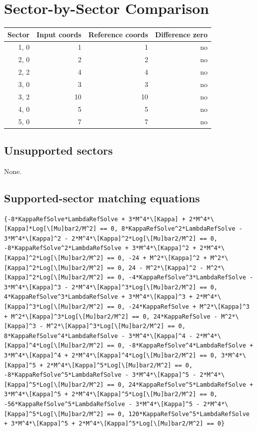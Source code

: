 \documentclass[11pt]{article}
\begin{document}
\section{Sector-by-Sector Comparison}
\begin{longtable}{rrrr}
\toprule
Sector & Input coords & Reference coords & Difference zero \\
\midrule
{1, 0} & 1 & 1 & no \\
{2, 0} & 2 & 2 & no \\
{2, 2} & 4 & 4 & no \\
{3, 0} & 3 & 3 & no \\
{3, 2} & 10 & 10 & no \\
{4, 0} & 5 & 5 & no \\
{5, 0} & 7 & 7 & no \\
\bottomrule
\end{longtable}
\subsection{Unsupported sectors}
None.
\subsection{Supported-sector matching equations}
\begin{verbatim}
{-8*KappaRefSolve*LambdaRefSolve + 3*M^4*\[Kappa] + 2*M^4*\[Kappa]*Log[\[Mu]bar2/M^2] == 0, 8*KappaRefSolve^2*LambdaRefSolve - 3*M^4*\[Kappa]^2 - 2*M^4*\[Kappa]^2*Log[\[Mu]bar2/M^2] == 0, -8*KappaRefSolve^2*LambdaRefSolve + 3*M^4*\[Kappa]^2 + 2*M^4*\[Kappa]^2*Log[\[Mu]bar2/M^2] == 0, -24 + M^2*\[Kappa]^2 + M^2*\[Kappa]^2*Log[\[Mu]bar2/M^2] == 0, 24 - M^2*\[Kappa]^2 - M^2*\[Kappa]^2*Log[\[Mu]bar2/M^2] == 0, -4*KappaRefSolve^3*LambdaRefSolve - 3*M^4*\[Kappa]^3 - 2*M^4*\[Kappa]^3*Log[\[Mu]bar2/M^2] == 0, 4*KappaRefSolve^3*LambdaRefSolve + 3*M^4*\[Kappa]^3 + 2*M^4*\[Kappa]^3*Log[\[Mu]bar2/M^2] == 0, -24*KappaRefSolve + M^2*\[Kappa]^3 + M^2*\[Kappa]^3*Log[\[Mu]bar2/M^2] == 0, 24*KappaRefSolve - M^2*\[Kappa]^3 - M^2*\[Kappa]^3*Log[\[Mu]bar2/M^2] == 0, 8*KappaRefSolve^4*LambdaRefSolve - 3*M^4*\[Kappa]^4 - 2*M^4*\[Kappa]^4*Log[\[Mu]bar2/M^2] == 0, -8*KappaRefSolve^4*LambdaRefSolve + 3*M^4*\[Kappa]^4 + 2*M^4*\[Kappa]^4*Log[\[Mu]bar2/M^2] == 0, 3*M^4*\[Kappa]^5 + 2*M^4*\[Kappa]^5*Log[\[Mu]bar2/M^2] == 0, -8*KappaRefSolve^5*LambdaRefSolve - 3*M^4*\[Kappa]^5 - 2*M^4*\[Kappa]^5*Log[\[Mu]bar2/M^2] == 0, 24*KappaRefSolve^5*LambdaRefSolve + 3*M^4*\[Kappa]^5 + 2*M^4*\[Kappa]^5*Log[\[Mu]bar2/M^2] == 0, -56*KappaRefSolve^5*LambdaRefSolve - 3*M^4*\[Kappa]^5 - 2*M^4*\[Kappa]^5*Log[\[Mu]bar2/M^2] == 0, 120*KappaRefSolve^5*LambdaRefSolve + 3*M^4*\[Kappa]^5 + 2*M^4*\[Kappa]^5*Log[\[Mu]bar2/M^2] == 0}
\end{verbatim}
\end{document}
